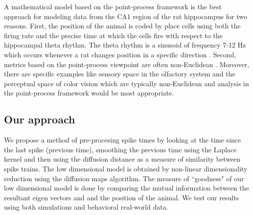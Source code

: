 
A mathematical model based on the point-process framework is the best approach for 
modeling  data from the CA1 region of the rat hippocampus for two reasons.
First, the position of the animal is coded by place cells using both the firing rate
and the precise time at which the cells fire with respect to the hippocampal theta rhythm.
The theta rhythm is a sinusoid of frequency 7-12 Hz which occurs whenever a rat changes
position in  a specific direction \cite{OKeefe1971, Burgess1993}.
Second,  metrics based on the point-process viewpoint are often non-Euclidean \cite{Aronov2004, Victor2005}. Moreover, there are specific examples like sensory space in  the olfactory system and the perceptual space of color vision which are typically non-Euclidean and analysis in the point-process framework would be most appropriate.\\


\subsection{Our approach}

We propose a method of pre-procesing spike times by looking at the time since the 
last spike (previous time), smoothing the previous time using the Laplace kernel
and then using the diffusion distance \cite{coifman2006diffusion} as a measure of similarity
between spike trains. The low dimensional model is obtained by non-linear dimensionality reduction using the diffusion maps algorithm. The measure of ``goodness" of our low dimensional model is done by comparing the mutual information  \cite{quiroga2009extracting, Dayan2001}  between the resultant eigen vectors and and the position of the animal. We test our results using both simulations and behavioral real-world data.\\


























